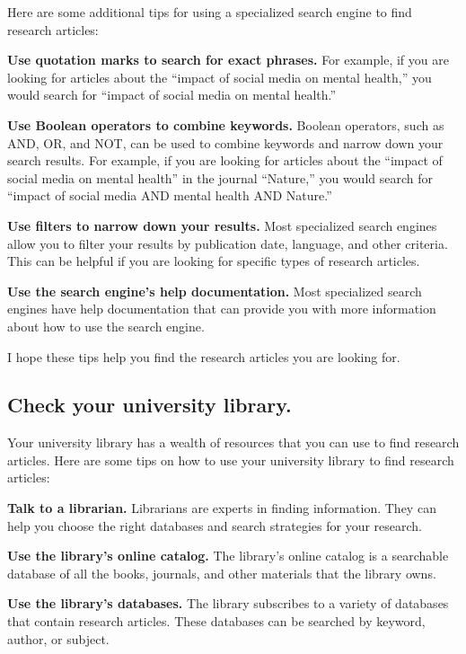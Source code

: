 \documentclass[
  b5paper]{book}
\begin{document}
Here are some additional tips for using a specialized search engine to find research articles:

\textbf{Use quotation marks to search for exact phrases.} For example, if you are looking for articles about the ``impact of social media on mental health,'' you would search for ``impact of social media on mental health.''

\textbf{Use Boolean operators to combine keywords.} Boolean operators, such as AND, OR, and NOT, can be used to combine keywords and narrow down your search results. For example, if you are looking for articles about the ``impact of social media on mental health'' in the journal ``Nature,'' you would search for ``impact of social media AND mental health AND Nature.''

\textbf{Use filters to narrow down your results.} Most specialized search engines allow you to filter your results by publication date, language, and other criteria. This can be helpful if you are looking for specific types of research articles.

\textbf{Use the search engine's help documentation.} Most specialized search engines have help documentation that can provide you with more information about how to use the search engine.

I hope these tips help you find the research articles you are looking for.

\hypertarget{check-your-university-library.}{%
\subsection*{Check your university library.}\label{check-your-university-library.}}

Your university library has a wealth of resources that you can use to find research articles. Here are some tips on how to use your university library to find research articles:

\textbf{Talk to a librarian.} Librarians are experts in finding information. They can help you choose the right databases and search strategies for your research.

\textbf{Use the library's online catalog.} The library's online catalog is a searchable database of all the books, journals, and other materials that the library owns.

\textbf{Use the library's databases.} The library subscribes to a variety of databases that contain research articles. These databases can be searched by keyword, author, or subject.
\end{document}
